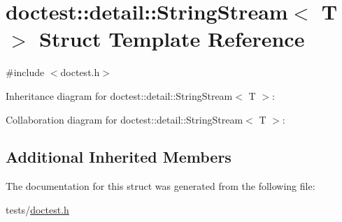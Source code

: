 \hypertarget{structdoctest_1_1detail_1_1StringStream}{}\section{doctest\+:\+:detail\+:\+:String\+Stream$<$ T $>$ Struct Template Reference}
\label{structdoctest_1_1detail_1_1StringStream}


{\ttfamily \#include $<$doctest.\+h$>$}



Inheritance diagram for doctest\+:\+:detail\+:\+:String\+Stream$<$ T $>$\+:


Collaboration diagram for doctest\+:\+:detail\+:\+:String\+Stream$<$ T $>$\+:
\subsection*{Additional Inherited Members}


The documentation for this struct was generated from the following file\+:\begin{DoxyCompactItemize}
\item 
tests/\hyperlink{doctest_8h}{doctest.\+h}\end{DoxyCompactItemize}
